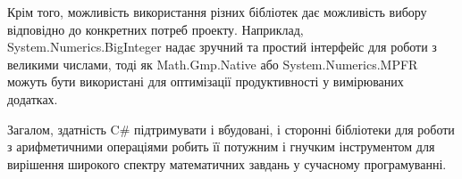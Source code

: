 Крім того, можливість використання різних бібліотек дає можливість вибору відповідно до конкретних потреб проекту. Наприклад, System.Numerics.BigInteger надає зручний та простий інтерфейс для роботи з великими числами, тоді як Math.Gmp.Native або System.Numerics.MPFR можуть бути використані для оптимізації продуктивності у вимірюваних додатках.

Загалом, здатність C\# підтримувати і вбудовані, і сторонні бібліотеки для роботи з арифметичними операціями робить її потужним і гнучким інструментом для вирішення широкого спектру математичних завдань у сучасному програмуванні.


